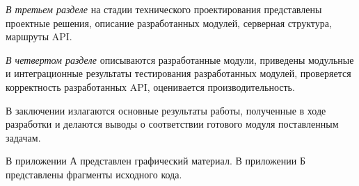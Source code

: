 \emph{В третьем разделе} на стадии технического проектирования представлены проектные решения, описание разработанных модулей, серверная структура, маршруты API.

\emph{В четвертом разделе} описываются разработанные модули, приведены модульные и интеграционные результаты тестирования разработанных модулей, проверяется корректность разработанных API, оценивается производительность.

В заключении излагаются основные результаты работы, полученные в ходе разработки и делаются выводы о соответствии готового модуля поставленным задачам.

В приложении А представлен графический материал. В приложении Б представлены фрагменты исходного кода. 
